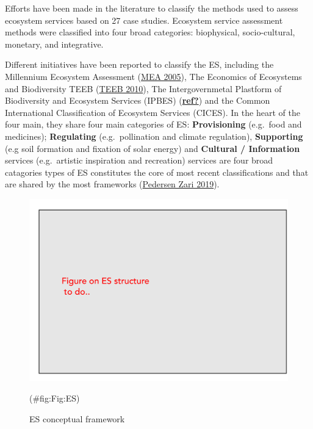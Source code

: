 \documentclass[
  14pt,
]{extarticle}
\begin{document}
Efforts have been made in the literature to classify the methods used to assess ecosystem services based on 27 case studies. Ecosystem service assessment methods were classified into four broad categories: biophysical, socio-cultural, monetary, and integrative.

Different initiatives have been reported to classify the ES, including the Millennium Ecosystem Assessment (\protect\hyperlink{ref-MEA2005}{MEA 2005}),
The Economics of Ecosystems and Biodiversity TEEB (\protect\hyperlink{ref-TEEB2010}{TEEB 2010}),
The Intergovernmetal Plastform of Biodiversity and Ecosystem Services (IPBES) (\protect\hyperlink{ref-ref}{\textbf{ref?}}) and the Common International Classification of Ecosystem Services (CICES).
In the heart of the four main, they share four main categories of ES:
\textbf{Provisioning} (e.g.~food and medicines);
\textbf{Regulating} (e.g.~pollination and climate regulation),
\textbf{Supporting} (e.g soil formation and fixation of solar energy) and
\textbf{Cultural / Information} services (e.g.~artistic inspiration and recreation) services are four broad catagories types of ES constitutes the core of most recent classifications and that are shared by the most frameworks (\protect\hyperlink{ref-PedersenZari2019}{Pedersen Zari 2019}).

\begin{figure}[!ht]

{\centering \includegraphics[width=1\linewidth]{Figures/Comparison} 

}

\caption{ES conceptual framework}(\#fig:Fig:ES)
\end{figure}
\end{document}
